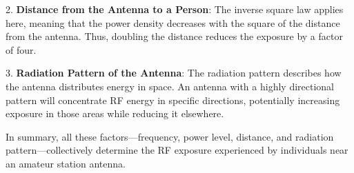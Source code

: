 2. \textbf{Distance from the Antenna to a Person}: The inverse square law applies here, meaning that the power density decreases with the square of the distance from the antenna. Thus, doubling the distance reduces the exposure by a factor of four.

3. \textbf{Radiation Pattern of the Antenna}: The radiation pattern describes how the antenna distributes energy in space. An antenna with a highly directional pattern will concentrate RF energy in specific directions, potentially increasing exposure in those areas while reducing it elsewhere.

In summary, all these factors—frequency, power level, distance, and radiation pattern—collectively determine the RF exposure experienced by individuals near an amateur station antenna.

